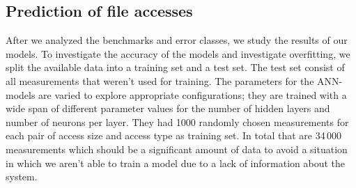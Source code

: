 \documentclass{superfri}
\begin{document}
\subsection{Prediction of file accesses}
After we analyzed the benchmarks and error classes, we study the results of our models.
To investigate the accuracy of the models and investigate overfitting, we split the available data into a training set and a test set. 
The test set consist of all measurements that weren't used for training.
The parameters for the ANN-models are varied to explore appropriate configurations; they are trained with a wide span of different parameter values for the number of hidden layers and number of neurons per layer.
They had 1000 randomly chosen measurements for each pair of access size and access type as training set. %
%
In total that are 34\,000 measurements which should be a significant amount of data to avoid a situation in which we aren't able to train a model due to a lack of information about the system. 

\medskip
\end{document}
